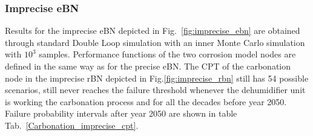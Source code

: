 \subsubsection{Imprecise eBN}
Results for the imprecise eBN depicted in Fig.~\ref{fig:imprecise_ebn} are obtained through standard Double Loop simulation with an inner Monte Carlo simulation with $10^3$ samples. 
Performance functions of the two corrosion model nodes are defined in the same way as for the precise eBN.
The CPT of the carbonation node in the imprecise rBN depicted in Fig.\ref{fig:imprecise_rbn} still has 54 possible scenarios, still never reaches the failure threshold whenever the dehumidifier unit is working the carbonation process and for all the decades before year 2050. Failure probability intervals after year 2050 are shown in table Tab.~\ref{Carbonation_imprecise_cpt}.

